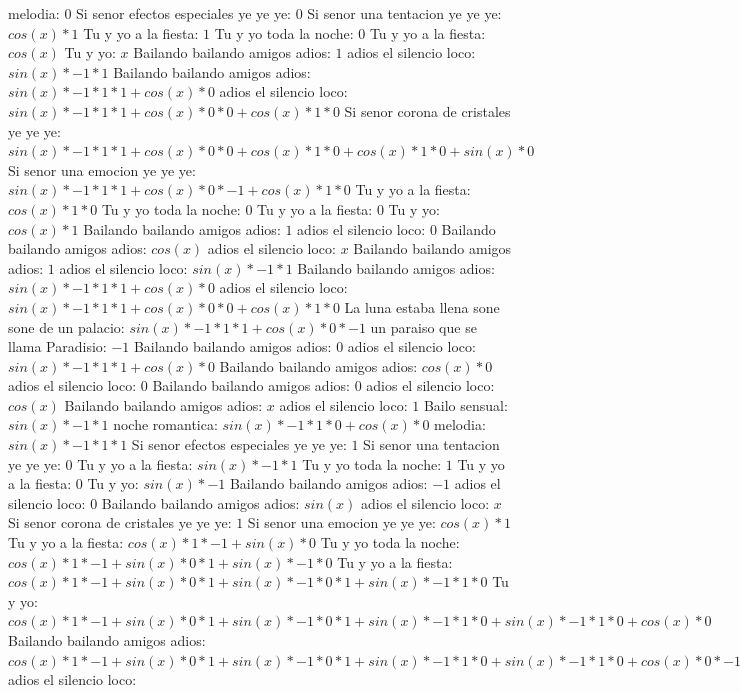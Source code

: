 \documentclass{article}
\begin{document}
melodia: $0$ Si senor efectos especiales ye ye ye: $0$  \newline Si senor una tentacion ye ye ye: $cos(x)*1$ Tu y yo a la fiesta: $1$ Tu y yo toda la noche: $0$  \newline Tu y yo a la fiesta: $cos(x)$  \newline Tu y yo: $x$ Bailando bailando amigos adios: $1$  \newline adios el silencio loco: $sin(x)*-1*1$ Bailando bailando amigos adios: $sin(x)*-1*1*1+cos(x)*0$ adios el silencio loco: ${sin(x)*-1*1*1+cos(x)*0}*0+cos(x)*1*0$ Si senor corona de cristales ye ye ye: ${sin(x)*-1*1*1+cos(x)*0}*0+cos(x)*1*0+cos(x)*1*0+sin(x)*0$ Si senor una emocion ye ye ye: ${sin(x)*-1*1*1+cos(x)*0}*-1+cos(x)*1*0$  \newline Tu y yo a la fiesta: $cos(x)*1*0$ Tu y yo toda la noche: $0$ Tu y yo a la fiesta: $0$  \newline Tu y yo: $cos(x)*1$ Bailando bailando amigos adios: $1$ adios el silencio loco: $0$  \newline Bailando bailando amigos adios: $cos(x)$  \newline adios el silencio loco: $x$ Bailando bailando amigos adios: $1$  \newline adios el silencio loco: $sin(x)*-1*1$ Bailando bailando amigos adios: $sin(x)*-1*1*1+cos(x)*0$ adios el silencio loco: ${sin(x)*-1*1*1+cos(x)*0}*0+cos(x)*1*0$ La luna estaba llena sone sone de un palacio: ${sin(x)*-1*1*1+cos(x)*0}*-1$ un paraiso que se llama Paradisio: $-1$ Bailando bailando amigos adios: $0$  \newline adios el silencio loco: $sin(x)*-1*1*1+cos(x)*0$  \newline Bailando bailando amigos adios: $cos(x)*0$ adios el silencio loco: $0$ Bailando bailando amigos adios: $0$  \newline adios el silencio loco: $cos(x)$  \newline Bailando bailando amigos adios: $x$ adios el silencio loco: $1$  \newline Bailo sensual: $sin(x)*-1*1$ noche romantica: $sin(x)*-1*1*0+cos(x)*0$ melodia: $sin(x)*-1*1*1$ Si senor efectos especiales ye ye ye: $1$ Si senor una tentacion ye ye ye: $0$  \newline Tu y yo a la fiesta: $sin(x)*-1*1$ Tu y yo toda la noche: $1$ Tu y yo a la fiesta: $0$  \newline Tu y yo: $sin(x)*-1$ Bailando bailando amigos adios: $-1$ adios el silencio loco: $0$  \newline Bailando bailando amigos adios: $sin(x)$  \newline adios el silencio loco: $x$ Si senor corona de cristales ye ye ye: $1$  \newline Si senor una emocion ye ye ye: $cos(x)*1$ Tu y yo a la fiesta: $cos(x)*1*-1+sin(x)*0$ Tu y yo toda la noche: ${cos(x)*1*-1+sin(x)*0}*1+sin(x)*-1*0$ Tu y yo a la fiesta: ${{cos(x)*1*-1+sin(x)*0}*1+sin(x)*-1*0}*1+sin(x)*-1*1*0$ Tu y yo: ${{cos(x)*1*-1+sin(x)*0}*1+sin(x)*-1*0}*1+sin(x)*-1*1*0+sin(x)*-1*1*0+cos(x)*0$ Bailando bailando amigos adios: ${{{cos(x)*1*-1+sin(x)*0}*1+sin(x)*-1*0}*1+sin(x)*-1*1*0+sin(x)*-1*1*0+cos(x)*0}*-1+{sin(x)*-1*1*1+cos(x)*0}*0$ adios el silencio loco: 
\end{document}
